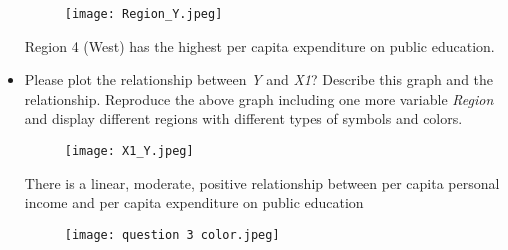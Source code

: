 \documentclass[12pt,letterpaper]{article}
\begin{document}
\begin{itemize}
		
\begin{figure}[H]
		\texttt{[image: Region\_Y.jpeg]}
\end{figure}
\vspace{.5cm}
		\noindent Region 4 (West) has the highest per capita expenditure on public education.
		\vspace{.5cm}
		
		\item
		Please plot the relationship between \emph{Y} and \emph{X1}? Describe this graph and the relationship. Reproduce the above graph including one more variable \emph{Region} and display different regions with different types of symbols and colors.
		
	
	\vspace{.5cm}
\begin{figure}[H]
		\texttt{[image: X1\_Y.jpeg]}
\end{figure}
	\vspace{.5cm}	
	\noindent There is a linear, moderate, positive relationship between per capita personal income and per capita expenditure on public education
	\vspace{.5cm}
	
	
\vspace{.5cm}	
\begin{figure}[H]
	\texttt{[image: question 3 color.jpeg]}
\end{figure}

	\end{itemize}
	
\end{document}
